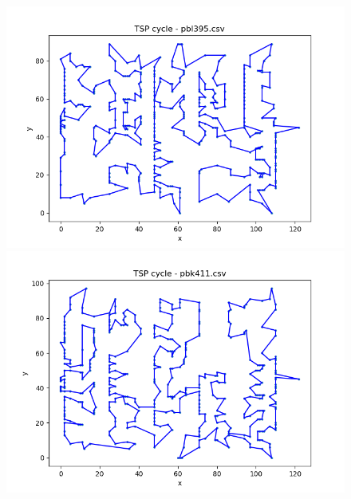 \documentclass[12pt]{article}
\begin{document}
        \begin{figure}[h]
            \centering
            \includegraphics[width=0.8\linewidth]{img/pbl395.png}
            \label{fig:pbl395}
            \includegraphics[width=0.8\linewidth]{img/pbk411.png}
            \label{fig:pbk411}
        \end{figure}

        \newpage
\end{document}
